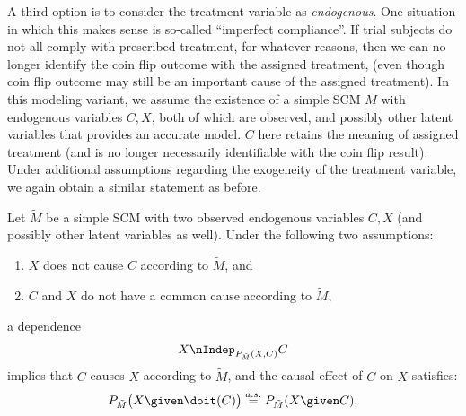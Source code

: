 A third option is to consider the treatment variable as \emph{endogenous}.
One situation in which this makes sense is so-called ``imperfect compliance''.
If trial subjects do not all comply with prescribed treatment, for whatever reasons, 
then we can no longer identify the coin flip outcome with the assigned treatment,
(even though coin flip outcome may still be an important cause of the assigned
treatment). In this modeling variant, 
we assume the existence of a simple SCM $M$
with endogenous variables $C, X$, both of which are observed, and possibly other
latent variables that provides an accurate model. $C$ here retains the meaning
of assigned treatment (and is no longer necessarily identifiable with the coin
flip result).
Under additional assumptions regarding the exogeneity of the treatment variable,
we again obtain a similar statement as before.
\begin{Prp}\label{prp:RCT3}
Let $\tilde{M}$ be a simple SCM with two observed endogenous variables $C, X$
(and possibly other latent variables as well).
Under the following two assumptions:
  \begin{enumerate}
    \item $X$ does not cause $C$ according to $\tilde{M}$, and
    \item $C$ and $X$ do not have a common cause according to $\tilde{M}$,
  \end{enumerate}
a dependence 
  \begin{equation}\label{eq:RCT_CI_statement3}
    X \nIndep_{P_{\tilde{M}}(X,C)} C
  \end{equation}
  implies that $C$ causes $X$ according to $\tilde{M}$, and the causal effect of $C$ on $X$ satisfies:
  \begin{equation}\label{eq:RCT_causal_effect3}
    P_{\tilde{M}}\big(X \given \doit(C)\big) \stackrel{a.s.}{=} P_{\tilde{M}}(X \given C).
  \end{equation}
\end{Prp}
